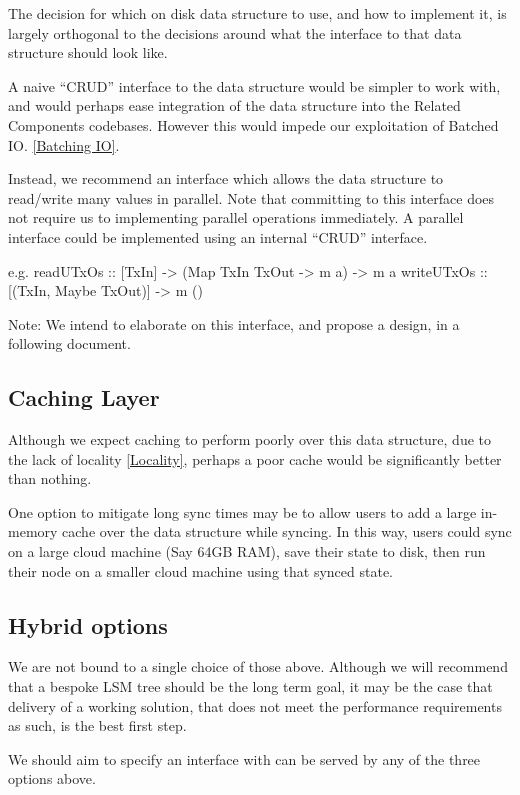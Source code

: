 \documentclass[11pt,a4paper]{article}
\begin{document}
The decision for which on disk data structure to use, and how to implement it,
is largely orthogonal to the decisions around what the interface to that data
structure should look like.

A naive ``CRUD'' interface to the data structure would be simpler to work with,
and would perhaps ease integration of the data structure into the Related Components
codebases. However this would impede our exploitation of Batched IO. \ref{Batching IO}.

Instead, we recommend an interface which allows the data structure to read/write
many values in parallel. Note that committing to this interface does not require
us to implementing parallel operations immediately. A parallel interface could
be implemented using an internal ``CRUD'' interface.

e.g.
readUTxOs :: [TxIn] -> (Map TxIn TxOut -> m a) -> m a
writeUTxOs :: [(TxIn, Maybe TxOut)] -> m ()


Note: We intend to elaborate on this interface, and propose a design, in a
following document.

\subsection{Caching Layer}
\label{Caching Layer}

Although we expect caching to perform poorly over this data structure, due to the
lack of locality \ref{Locality}, perhaps a poor cache would be significantly
better than nothing.

One option to mitigate long sync times may be to allow users to add a large
in-memory cache over the data structure while syncing. In this way, users could
sync on a large cloud machine (Say 64GB RAM), save their state to disk, then run
their node on a smaller cloud machine using that synced state.


\subsection{Hybrid options}

We are not bound to a single choice of those above. Although we will recommend that
a bespoke LSM tree should be the long term goal, it may be the case that delivery of a
working solution, that does not meet the performance requirements as such, is
the best first step.

We should aim to specify an interface with can be served by any of the three
options above.
\end{document}
